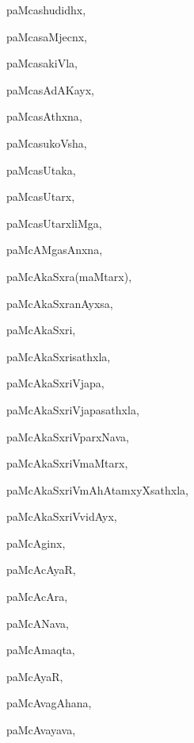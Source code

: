 \begin{multicols}{3}
{\noindent
{paMcashudidhx}, \pageref{paMcashudidhx}

\noindent
{paMcasaMjecnx}, \pageref{paMcasaMjecnx}

\noindent
{paMcasakiVla}, \pageref{paMcasakiVla}

\noindent
{paMcasAdAKayx}, \pageref{paMcasAdAKayx}

\noindent
{paMcasAthxna}, \pageref{paMcasAthxna}

\noindent
{paMcasukoVsha}, \pageref{paMcasukoVsha}

\noindent
{paMcasUtaka}, \pageref{paMcasUtaka}

\noindent
{paMcasUtarx}, \pageref{paMcasUtarx}

\noindent
{paMcasUtarxliMga}, \pageref{paMcasUtarxliMga}

\noindent
{paMcAMgasAnxna}, \pageref{paMcAMgasAnxna}

\noindent
{paMcAkaSxra(maMtarx)}, \pageref{paMcAkaSxramaMtarx}

\noindent
{paMcAkaSxranAyxsa}, \pageref{paMcAkaSxranAyxsa}

\noindent
{paMcAkaSxri}, \pageref{paMcAkaSxri}

\noindent
{paMcAkaSxrisathxla}, \pageref{paMcAkaSxrisathxla}

\noindent
{paMcAkaSxriVjapa}, \pageref{paMcAkaSxriVjapa}

\noindent
{paMcAkaSxriVjapasathxla}, \pageref{paMcAkaSxriVjapasathxla}

\noindent
{paMcAkaSxriVparxNava}, \pageref{paMcAkaSxriVparxNava}

\noindent
{paMcAkaSxriVmaMtarx}, \pageref{paMcAkaSxriVmaMtarx}

\noindent
{paMcAkaSxriVmAhAtamxyXsathxla}, \pageref{paMcAkaSxriVmAhAtamxyXsathxla}

\noindent
{paMcAkaSxriVvidAyx}, \pageref{paMcAkaSxriVvidAyx}

\noindent
{paMcAginx}, \pageref{paMcAginx}

\noindent
{paMcAcAyaR}, \pageref{paMcAcAyaR}

\noindent
{paMcAcAra}, \pageref{paMcAcAra}

\noindent
{paMcANava}, \pageref{paMcANava}

\noindent
{paMcAmaqta}, \pageref{paMcAmaqta}

\noindent
{paMcAyaR}, \pageref{paMcAyaR}

\noindent
{paMcAvagAhana}, \pageref{paMcAvagAhana}

\noindent
{paMcAvayava}, \pageref{paMcAvayava}

}
\end{multicols}

